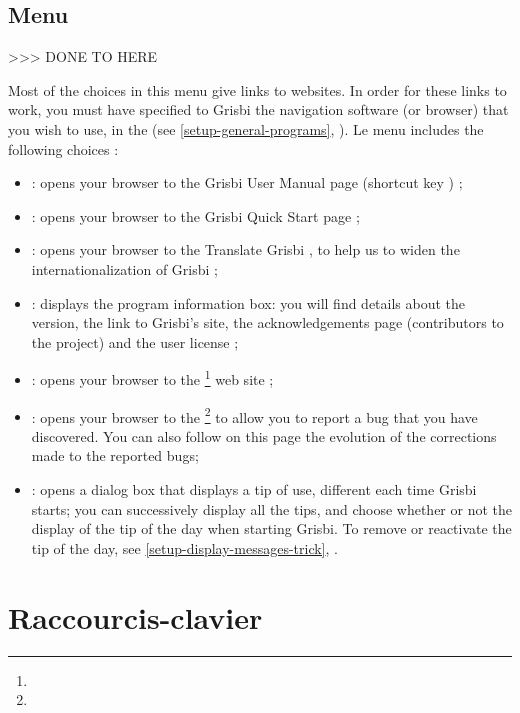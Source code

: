 \subsection{Menu \label{home-menus-help}}

>>> DONE TO HERE



Most of the choices in this menu give links to websites. In order for these links to work, you must have specified to Grisbi the navigation software (or browser) that you wish to use, in the  (see \vref{setup-general-programs}, ). Le menu   includes the following choices :

\begin{itemize}
	\item {} : opens your browser to the \og Grisbi User Manual page \fg{} (shortcut key  ) ;
	\item {} : opens your browser to the \og Grisbi Quick Start page \fg{} ;
	\item {} : opens your browser to the \og Translate Grisbi \fg{}, to help us to widen the internationalization of Grisbi ;
	\item {} : displays the program information box: you will find details about the version, the link to Grisbi's site, the acknowledgements page (contributors to the project) and the user license ;
	\item {} : opens your browser to the \footnote{\urlGrisbi{}} web site ;
	\item {} : opens your browser to the \footnote{\urlBugTracker{}} to allow you to report a bug that you have discovered. You can also follow on this page the evolution of the corrections made to the reported bugs;
	\item {} : opens a dialog box that displays a tip of use, different each time Grisbi starts; you can successively display all the tips, and choose whether or not the display of the tip of the day when starting Grisbi. To remove or reactivate the tip of the day, see \vref{setup-display-messages-trick}, .
\end{itemize}


\section{Raccourcis-clavier\label{home-shortcuts}}


